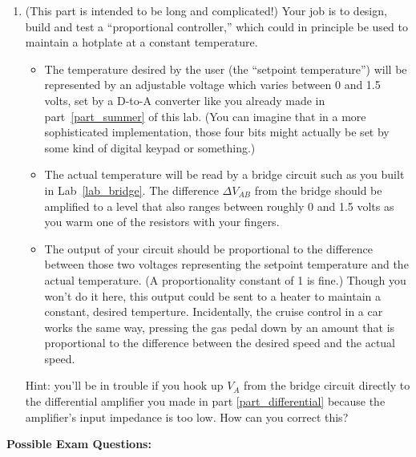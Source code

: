 \begin{enumerate}[wide]
\pagebreak[4]
\item (This part is intended to be long and complicated!)  Your job is to design, build and test a ``proportional controller,'' which could in principle be used to maintain a hotplate at a constant temperature.
\begin{itemize}[nosep]
\item The temperature desired by the user (the ``setpoint temperature'') will be represented by an adjustable voltage which varies between 0 and 1.5 volts, set by a D-to-A converter like you already made in part~\ref{part_summer} of this lab.  (You can imagine that in a more sophisticated implementation, those four bits might actually be set by some kind of digital keypad or something.)
\item The actual temperature will be read by a bridge circuit such as you built in Lab~\ref{lab_bridge}.  The difference $\Delta V_{AB}$ from the bridge should be amplified to a level that also ranges between roughly 0 and 1.5 volts as you warm one of the resistors with your fingers.
\item The output of your circuit should be proportional to the difference between those two voltages representing the setpoint temperature and the actual temperature.  (A proportionality constant of 1 is fine.)  Though you won't do it here, this output could be sent to a heater to maintain a constant, desired temperture.  Incidentally, the cruise control in a car works the same way, pressing the gas pedal down by an amount that is proportional to the difference between the desired speed and the actual speed.
\end{itemize}
Hint: you'll be in trouble if you hook up $V_A$ from the bridge circuit directly to the differential amplifier you made in part \ref{part_differential} because the amplifier's input impedance is too low.  How can you correct this? \label{part_proportional_controller}


\end{enumerate}

\textbf{Possible Exam Questions:}

